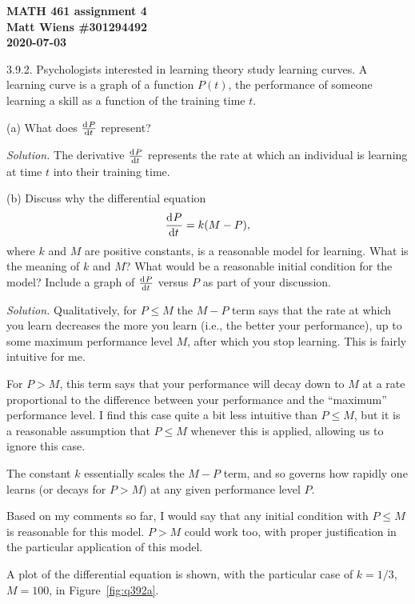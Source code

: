 \documentclass{article}
\begin{document}
\textbf{MATH 461 assignment 4} \\
\textbf{Matt Wiens \#301294492} \\
\textbf{2020-07-03}

3.9.2. Psychologists interested in learning theory study learning
curves. A learning curve is a graph of a function $P(t)$, the
performance of someone learning a skill as a function of the training
time $t$.

(a) What does $\od{P}{t}$ represent?

\textit{Solution.}
The derivative $\od{P}{t}$ represents the rate at which an individual is
learning at time $t$ into their training time.

\vspace{5mm}

(b) Discuss why the differential equation
%
\begin{equation*}
    \dod{P}{t} = k (M - P),
\end{equation*}
%
where $k$ and $M$ are positive constants, is a reasonable model for
learning. What is the meaning of $k$ and $M$? What would be a reasonable
initial condition for the model? Include a graph of $\od{P}{t}$ versus
$P$ as part of your discussion.

\textit{Solution.}
Qualitatively, for $P \leq M$ the $M - P$ term says that the rate at
which you learn decreases the more you learn (i.e., the better your
performance), up to some maximum performance level $M$, after which you
stop learning. This is fairly intuitive for me.

For $P > M$, this term says that your performance will decay down to $M$
at a rate proportional to the difference between your performance and the
``maximum'' performance level. I find this case quite a bit less intuitive
than $P \leq M$, but it is a reasonable assumption that $P \leq M$ whenever
this is applied, allowing us to ignore this case.

The constant $k$ essentially scales the $M - P$ term, and so governs how
rapidly one learns (or decays for $P > M$) at any given performance level $P$.

Based on my comments so far, I would say that any initial condition
with $P \leq M$ is reasonable for this model. $P > M$ could work too,
with proper justification in the particular application of this model.

A plot of the differential equation is shown, with the particular case
of $k = 1/3$, $M = 100$, in Figure~\ref{fig:q392a}.
\end{document}
